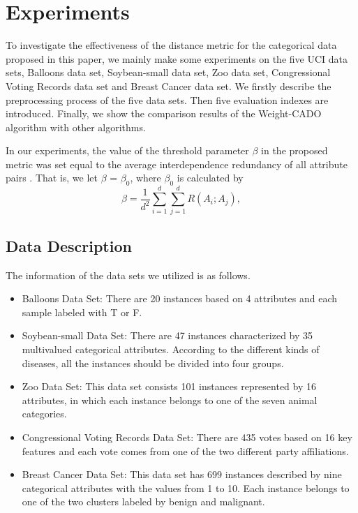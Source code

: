 \documentclass[review]{elsarticle}
\begin{document}
\section{Experiments}
To investigate the effectiveness of the distance metric for the categorical data proposed in this paper, we mainly make some experiments on the five UCI data sets, Balloons data set, Soybean-small data set, Zoo data set, Congressional Voting Records data set and Breast Cancer data set. We firstly describe the preprocessing process of the five data sets. Then five evaluation indexes are introduced. Finally, we show the comparison results of the Weight-CADO algorithm with other algorithms.

In our experiments, the value of the threshold parameter $\beta$ in the proposed metric was set equal to the average interdependence redundancy of all attribute pairs \cite{JiaH2016NewMetric}. That is, we let $\beta$ = $\beta_0$, where $\beta_0$ is calculated by
\begin{equation}
\beta = \frac{1}{d^2}\sum_{i=1}^{d}\sum_{j=1}^{d}R(A_i;A_j),
\label{equ21}
\end{equation}

\subsection{Data Description}
The information of the data sets we utilized is as follows.
\begin{itemize}
  \item Balloons Data Set: There are 20 instances based on 4 attributes and each sample labeled with T or F.
  \item Soybean-small Data Set: There are 47 instances characterized by 35 multivalued categorical attributes. According to the different kinds of diseases, all the instances should be divided into four groups.
  \item Zoo Data Set: This data set consists 101 instances represented by 16 attributes, in which each instance belongs to one of the seven animal categories.
  \item Congressional Voting Records Data Set: There are 435 votes based on 16 key features and each vote comes from one of the two different party affiliations.
  \item Breast Cancer Data Set: This data set has 699 instances described by nine categorical attributes with the values from 1 to 10. Each instance belongs to one of the two clusters labeled by benign and malignant.
\end{itemize}
\end{document}
